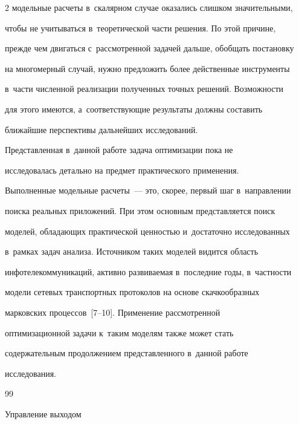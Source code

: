 \begin{multicols}{2}
модельные расчеты в~скалярном случае оказались слишком значительными, 


чтобы не учитываться в~теоретической час\-ти решения. По этой причине, 


прежде чем двигаться с~рассмотренной задачей дальше, обобщать постановку 


на многомерный случай, нуж\-но предложить более действенные инструменты 


в~час\-ти чис\-лен\-ной реализации полученных точных решений. Возможности 


для этого имеются, а~соответствующие результаты должны составить 


ближайшие перспективы дальнейших исследований.


     


     Представленная в~данной работе задача оптимизации пока не 


исследовалась детально на предмет практического применения. 


Выполненные модельные расчеты~--- это, скорее, первый шаг в~на\-прав\-ле\-нии 


поиска реальных приложений. При этом основным представляется поиск 


моделей, обладающих практической ценностью и~достаточно исследованных 


в~рамках задач анализа. Источником таких моделей видится область 


инфотелекоммуникаций, активно развиваемая в~последние годы, в~част\-ности 


модели сетевых транспортных протоколов на основе скачкообразных 


марковских процессов~[7--10]. Применение рассмотренной 


оптимизационной задачи к~таким моделям также может стать 


содержательным продолжением представленного в~данной работе 


исследования.





{\small\frenchspacing


 {%




 \begin{thebibliography}{99}




 Управление выходом 



\end{thebibliography}}}
\end{multicols}
